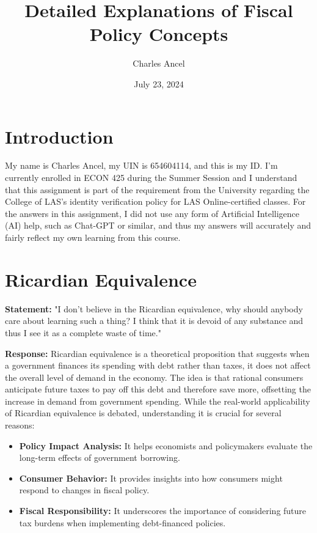 \documentclass{article}
\title{Detailed Explanations of Fiscal Policy Concepts}
\author{Charles Ancel}
\date{July 23, 2024}
\begin{document}
\maketitle

\section{Introduction}
My name is Charles Ancel, my UIN is 654604114, and this is my ID. I'm currently
enrolled in ECON 425 during the Summer Session and I understand that this
assignment is part of the requirement from the University regarding the College
of LAS's identity verification policy for LAS Online-certified classes. For the
answers in this assignment, I did not use any form of Artificial Intelligence (AI)
help, such as Chat-GPT or similar, and thus my answers will accurately and fairly
reflect my own learning from this course.

\hrulefill

\section{Ricardian Equivalence}

\textbf{Statement:} "I don’t believe in the Ricardian equivalence, why should anybody care about learning such a thing? I think that it is devoid of any substance and thus I see it as a complete waste of time."

\textbf{Response:}
Ricardian equivalence is a theoretical proposition that suggests when a government finances its spending with debt rather than taxes, it does not affect the overall level of demand in the economy. The idea is that rational consumers anticipate future taxes to pay off this debt and therefore save more, offsetting the increase in demand from government spending. While the real-world applicability of Ricardian equivalence is debated, understanding it is crucial for several reasons:

\begin{itemize}
    \item \textbf{Policy Impact Analysis:} It helps economists and policymakers evaluate the long-term effects of government borrowing.
    \item \textbf{Consumer Behavior:} It provides insights into how consumers might respond to changes in fiscal policy.
    \item \textbf{Fiscal Responsibility:} It underscores the importance of considering future tax burdens when implementing debt-financed policies.
\end{itemize}
\end{document}
